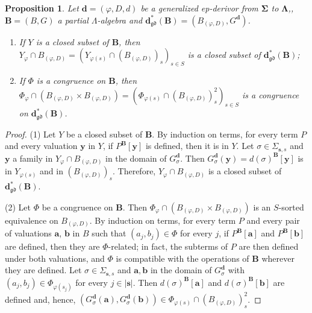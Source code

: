 \documentclass{amsart}
\newcommand{\bb}[1]{\ensuremath{\lvert #1 \rvert}}
\theoremstyle{plain}
\newtheorem{proposition}[theorem]{Proposition}
\theoremstyle{definition}
\begin{document}
\begin{proposition}\label{PGenDerClCong}
Let $\mathbf{d}=(\varphi,D,d)$ be a generalized ep-derivor from $\mathbf{\Sigma}$ to $\mathbf{\Lambda}$,, $\mathbf{B}=(B,G)$ a partial $\Lambda$-algebra and $\mathbf{d}^{\ast}_{\mathfrak{gd}}(\mathbf{B})=(B_{(\varphi,D)},G^{\mathbf{d}})$.
\begin{enumerate}
\item If $Y$ is a closed subset of $\mathbf{B}$, then $Y_{\varphi}\cap B_{(\varphi,D)}=(Y_{\varphi(s)}\cap(B_{(\varphi,D)})_{s})_{s\in S}$ is a closed subset of $\mathbf{d}^{\ast}_{\mathfrak{gd}}(\mathbf{B})$;
\item If $\Phi$ is a congruence on $\mathbf{B}$, then $\Phi_{\varphi}\cap(B_{(\varphi,D)}\times B_{(\varphi,D)})=(\Phi_{\varphi(s)}\cap(B_{(\varphi,D)})_{s}^{2})_{s\in S}$ is a congruence on $\mathbf{d}^{\ast}_{\mathfrak{gd}}(\mathbf{B})$.
\end{enumerate}
\end{proposition}
\begin{proof}
(1) Let $Y$ be a closed subset of $\mathbf{B}$. By induction on terms, for every term $P$ and every valuation $\mathbf{y}$ in $Y$, if $P^{\mathbf{B}}[\mathbf{y}]$ is defined, then it is in $Y$. Let $\sigma\in\Sigma_{\mathbf{s},s}$ and $\mathbf{y}$ a family in $Y_{\varphi}\cap B_{(\varphi,D)}$ in the domain of $G^{\mathbf{d}}_{\sigma}$. Then $G^{\mathbf{d}}_{\sigma}(\mathbf{y})=d(\sigma)^{\mathbf{B}}[\mathbf{y}]$ is in $Y_{\varphi(s)}$ and in $(B_{(\varphi,D)})_{s}$. Therefore, $Y_{\varphi}\cap B_{(\varphi,D)}$ is a closed subset of $\mathbf{d}^{\ast}_{\mathfrak{gd}}(\mathbf{B})$.

(2) Let $\Phi$ be a congruence on $\mathbf{B}$. Then $\Phi_{\varphi}\cap(B_{(\varphi,D)}\times B_{(\varphi,D)})$ is an $S$-sorted equivalence on $B_{(\varphi,D)}$. By induction on terms, for every term $P$ and every pair of valuations $\mathbf{a}$, $\mathbf{b}$ in $B$ such that $(a_{j},b_{j})\in\Phi$ for every $j$, if $P^{\mathbf{B}}[\mathbf{a}]$ and $P^{\mathbf{B}}[\mathbf{b}]$ are defined, then they are $\Phi$-related; in fact, the subterms of $P$ are then defined under both valuations, and $\Phi$ is compatible with the operations of $\mathbf{B}$ wherever they are defined. Let $\sigma\in\Sigma_{\mathbf{s},s}$ and $\mathbf{a},\mathbf{b}$ in the domain of $G^{\mathbf{d}}_{\sigma}$ with $(a_{j},b_{j})\in\Phi_{\varphi(s_{j})}$ for every $j\in\bb{\mathbf{s}}$. Then $d(\sigma)^{\mathbf{B}}[\mathbf{a}]$ and $d(\sigma)^{\mathbf{B}}[\mathbf{b}]$ are defined and, hence, $(G^{\mathbf{d}}_{\sigma}(\mathbf{a}),G^{\mathbf{d}}_{\sigma}(\mathbf{b}))\in\Phi_{\varphi(s)}\cap(B_{(\varphi,D)})_{s}^{2}$.
\end{proof}
\end{document}
